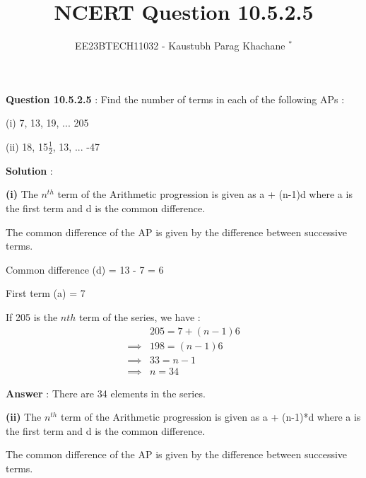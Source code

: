 \documentclass[journal,12pt,twocolumn]{IEEEtran}
\theoremstyle{remark}
\begin{document}

\vspace{3cm}

\Large\title{NCERT Question 10.5.2.5}
\large\author{EE23BTECH11032 - Kaustubh Parag Khachane $^{*}$%
}
\maketitle
\newpage
\bigskip

\renewcommand{\thefigure}{\theenumi}
\renewcommand{\thetable}{\theenumi}
\large\textbf{Question 10.5.2.5} : \normalsize Find the number of terms in each of the following APs : 

(i) 7, 13, 19, ... 205

(ii) 18, 15\(\frac{1}{2}\), 13, ... -47

\vspace{4mm} 

\large\textbf{Solution} :\normalsize

\vspace{4mm}

\textbf{(i)} The \(n^{th}\) term of the Arithmetic progression is given as a + (n-1)d where a is the first term and d is the common difference.

The common difference of the AP is given by the difference between successive terms.

\vspace{4mm}

Common difference (d) = 13 - 7 = 6

First term (a) = 7

\vspace{4mm}

If 205 is the \(n{th}\) term of the series, we have :
\begin{align}
&205 = 7 + (n-1)6\\ 
\implies&  198 = (n-1)6\\
\implies&  33 = n-1\\
\implies& n = 34
\end{align}

\large\textbf{Answer} : \normalsize There are 34 elements in the series.

\vspace{4mm}

\textbf{(ii)} The \(n^{th}\) term of the Arithmetic progression is given as a + (n-1)*d where a is the first term and d is the common difference.

The common difference of the AP is given by the difference between successive terms.
\end{document}
